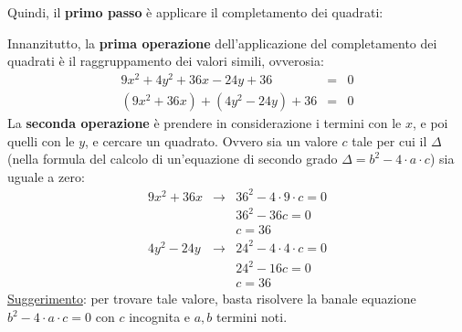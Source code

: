 \documentclass[a4paper]{article}
\begin{document}
	\noindent
	Quindi, il \textbf{primo passo} è applicare il completamento dei quadrati:
	\begin{mdframed}
		Innanzitutto, la \textbf{prima operazione} dell'applicazione del completamento dei quadrati è il raggruppamento dei valori simili, ovverosia:
		\begin{equation*}
			\begin{array}{rcl}
				9x^{2} + 4y^{2} + 36x - 24y + 36 &=& 0 \\
				\left(9x^{2} + 36x\right) + \left(4y^{2} - 24y\right) + 36 &=& 0
			\end{array}
		\end{equation*}
		La \textbf{seconda operazione} è prendere in considerazione i termini con le $x$, e poi quelli con le $y$, e cercare un quadrato. Ovvero sia un valore $c$ tale per cui il $\Delta$ (nella formula del calcolo di un'equazione di secondo grado $\Delta = b^{2} - 4 \cdot a \cdot c$) sia uguale a zero:
		\begin{equation*}
			\begin{array}{rcl}
				9x^{2} + 36x &\longrightarrow& 36^{2} - 4 \cdot 9 \cdot c = 0 \\
				&& 36^{2} - 36c = 0 \\
				&& c = 36 \\ [1em]
				4y^{2} - 24y &\longrightarrow& 24^{2} - 4 \cdot 4 \cdot c = 0 \\
				&& 24^{2} - 16c = 0 \\
				&& c = 36
			\end{array}
		\end{equation*}
		\underline{Suggerimento}: per trovare tale valore, basta risolvere la banale equazione $b^{2} - 4 \cdot a \cdot c = 0$ con $c$ incognita e $a,b$ termini noti.\newpage


\end{mdframed}
\end{document}
